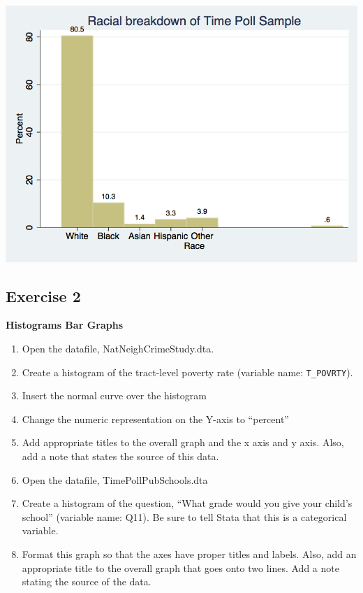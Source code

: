 \documentclass[]{book}
\providecommand{\tightlist}{%
  \setlength{\itemsep}{0pt}\setlength{\parskip}{0pt}}
\begin{document}
\includegraphics{Stata/StataModGraph/images/bargraph.png}

\hypertarget{exercise-2-6}{%
\subsection{Exercise 2}\label{exercise-2-6}}

\textbf{Histograms Bar Graphs}

\begin{enumerate}
\def\labelenumi{\arabic{enumi}.}
\tightlist
\item
  Open the datafile, NatNeighCrimeStudy.dta.
\item
  Create a histogram of the tract-level poverty rate (variable name: \texttt{T\_POVRTY}).
\item
  Insert the normal curve over the histogram
\item
  Change the numeric representation on the Y-axis to ``percent''
\item
  Add appropriate titles to the overall graph and the x axis and y axis. Also, add a note that states the source of this data.
\item
  Open the datafile, TimePollPubSchools.dta
\item
  Create a histogram of the question, ``What grade would you give your child's school'' (variable name: Q11). Be sure to tell Stata that this is a categorical variable.
\item
  Format this graph so that the axes have proper titles and labels. Also, add an appropriate title to the overall graph that goes onto two lines. Add a note stating the source of the data.
\end{enumerate}
\end{document}
